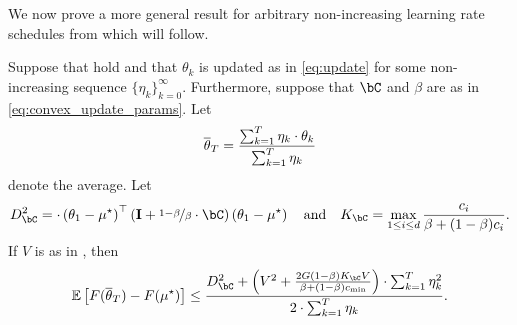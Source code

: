 We now prove a more general result for arbitrary non-increasing learning rate schedules from which  will follow.
\begin{theorem}\label{thm:convex_convergence_general}
    Suppose that  hold and that $\theta_k$ is updated as in \eqref{eq:update} for some non-increasing sequence $\{\eta_k\}_{k=0}^\infty$.  Furthermore, suppose that $\bC$ and $\beta$ are as in \eqref{eq:convex_update_params}.  Let
    \begin{align}
        \overline{\theta}_T = \frac{\sum_{k  =1}^T \eta_k \cdot \theta_k}{\sum_{k  =1}^T \eta_k}
    \end{align}
    denote the average.  Let
    \begin{align}\label{eq:dc_kc}
        D_{\bC}^2 =  \cdot \left( \theta_1 - \mustar \right)^\top \left(  \eye + \nicefrac{1-\beta}{\beta} \cdot \bC\right) \left( \theta_1 - \mustar \right) \quad \text{and} \quad K_\bC = \max_{1 \leq i \leq d} \frac{c_i}{\beta + (1 - \beta) c_i}.
    \end{align}
    If $V$ is as in , then
    \begin{align}
        \ee\left[ F(\thetabar_T) - F(\mustar) \right] \leq \frac{D_{\bC}^2 + \left( V^2 + \frac{2 G(1 - \beta) K_{\bC} V}{\beta + (1 - \beta) c_{\min}} \right) \cdot \sum_{k=1}^T \eta_k^2}{2 \cdot \sum_{k = 1}^T \eta_k}.
    \end{align}
\end{theorem}
